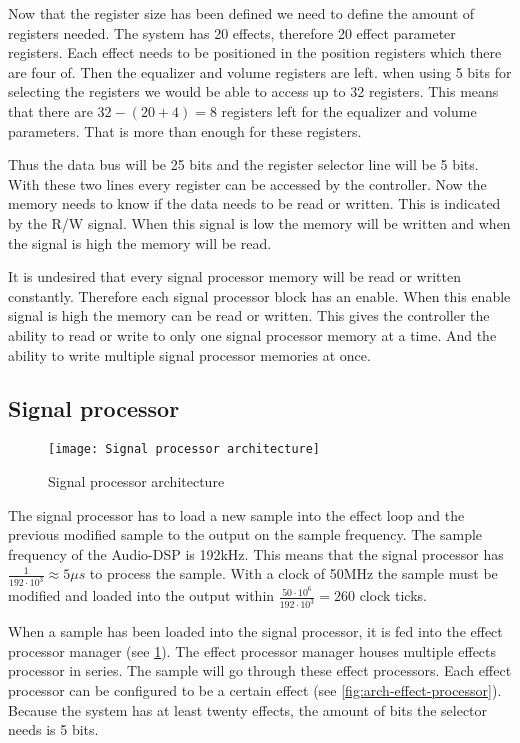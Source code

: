 Now that the register size has been defined we need to define the amount of registers needed. The system has 20 effects, therefore 20 effect parameter registers. Each effect needs to be positioned in the position registers which there are four of. Then the equalizer and volume registers are left. when using 5 bits for selecting the registers we would be able to access up to 32 registers. This means that there are $32 - (20 + 4) = 8$ registers left for the equalizer and volume parameters. That is more than enough for these registers.

Thus the data bus will be 25 bits and the register selector line will be 5 bits. With these two lines every register can be accessed by the controller. Now the memory needs to know if the data needs to be read or written. This is indicated by the R/W signal. When this signal is low the memory will be written and when the signal is high the memory will be read.

It is undesired that every signal processor memory will be read or written constantly. Therefore each signal processor block has an enable. When this enable signal is high the memory can be read or written. This gives the controller the ability to read or write to only one signal processor memory at a time. And the ability to write multiple signal processor memories at once.

\subsection{Signal processor}
\begin{figure}[ht]
    \texttt{[image: Signal processor architecture]}
    \caption{Signal processor architecture}
    \label{fig:arch-signal-processor}
\end{figure}

The signal processor has to load a new sample into the effect loop and the previous modified sample to the output on the sample frequency. The sample frequency of the Audio-DSP is 192kHz. This means that the signal processor has $\frac{1}{192 \cdot 10^3} \approx 5 \mu s$ to process the sample. With a clock of 50MHz the sample must be modified and loaded into the output within $\frac{50 \cdot 10^6}{192 \cdot 10^3}=260$ clock ticks.

When a sample has been loaded into the signal processor, it is fed into the effect processor manager (see \ref{fig:arch-signal-processor}). The effect processor manager houses multiple effects processor in series. The sample will go through these effect processors. Each effect processor can be configured to be a certain effect (see \ref{fig:arch-effect-processor}). Because the system has at least twenty effects, the amount of bits the selector needs is 5 bits.

